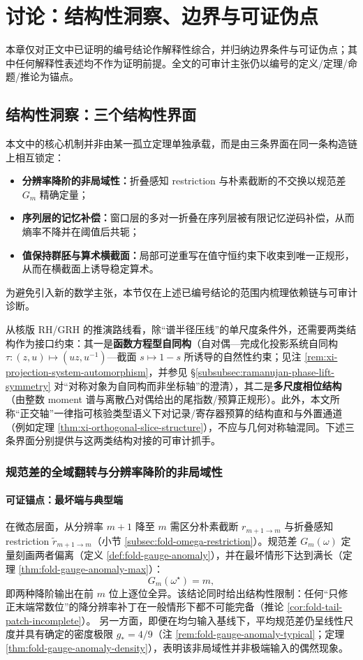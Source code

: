 \section{讨论：结构性洞察、边界与可证伪点}\label{sec:discussion}

本章仅对正文中已证明的编号结论作解释性综合，并归纳边界条件与可证伪点；其中任何解释性表述均不作为证明前提。全文的可审计主张仍以编号的定义/定理/命题/推论为锚点。

\subsection{结构性洞察：三个结构性界面}\label{subsec:structural-insights}
本文中的核心机制并非由某一孤立定理单独承载，而是由三条界面在同一条构造链上相互锁定：
\begin{itemize}
  \item \textbf{分辨率降阶的非局域性：}折叠感知 restriction 与朴素截断的不交换以规范差 \(G_m\) 精确定量；
  \item \textbf{序列层的记忆补偿：}窗口层的多对一折叠在序列层被有限记忆逆码补偿，从而熵率不降并在阈值后共轭；
  \item \textbf{值保持群胚与算术横截面：}局部可逆重写在值守恒约束下收束到唯一正规形，从而在横截面上诱导稳定算术。
\end{itemize}
为避免引入新的数学主张，本节仅在上述已编号结论的范围内梳理依赖链与可审计诊断。
\par
从核版 RH/GRH 的推演路线看，除“谱半径压线”的单尺度条件外，还需要两类结构作为接口约束：其一是\textbf{函数方程型自同构}（自对偶—完成化投影系统自同构 \(\tau:(z,u)\mapsto(uz,u^{-1})\)—截面 \(s\mapsto 1-s\) 所诱导的自然性约束；见注 \ref{rem:xi-projection-system-automorphism}，并参见 \S\ref{subsubsec:ramanujan-phase-lift-symmetry} 对“对称对象为自同构而非坐标轴”的澄清），其二是\textbf{多尺度相位结构}（由整数 moment 谱与离散凸对偶给出的尾指数/预算正规形）。此外，本文所称“正交轴”一律指可核验类型语义下对记录/寄存器预算的结构直和与外置通道（例如定理 \ref{thm:xi-orthogonal-slice-structure}），不应与几何对称轴混同。下述三条界面分别提供与这两类结构对接的可审计抓手。

\subsubsection{规范差的全域翻转与分辨率降阶的非局域性}\label{subsubsec:insight-gauge-anomaly}
\paragraph{可证锚点：最坏端与典型端}
在微态层面，从分辨率 \(m+1\) 降至 \(m\) 需区分朴素截断 \(r_{m+1\to m}\) 与折叠感知 restriction \(\widetilde r_{m+1\to m}\)（小节 \ref{subsec:fold-omega-restriction}）。规范差 \(G_m(\omega)\) 定量刻画两者偏离（定义 \ref{def:fold-gauge-anomaly}），并在最坏情形下达到满长（定理 \ref{thm:fold-gauge-anomaly-max}）：
\[
G_m(\omega^\star)=m,
\]
即两种降阶输出在前 \(m\) 位上逐位全异。该结论同时给出结构性限制：任何“只修正末端常数位”的降分辨率补丁在一般情形下都不可能完备（推论 \ref{cor:fold-tail-patch-incomplete}）。
另一方面，即便在均匀输入基线下，平均规范差仍呈线性尺度并具有确定的密度极限 \(g_\ast=4/9\)（注 \ref{rem:fold-gauge-anomaly-typical}；定理 \ref{thm:fold-gauge-anomaly-density}），表明该非局域性并非极端输入的偶然现象。

